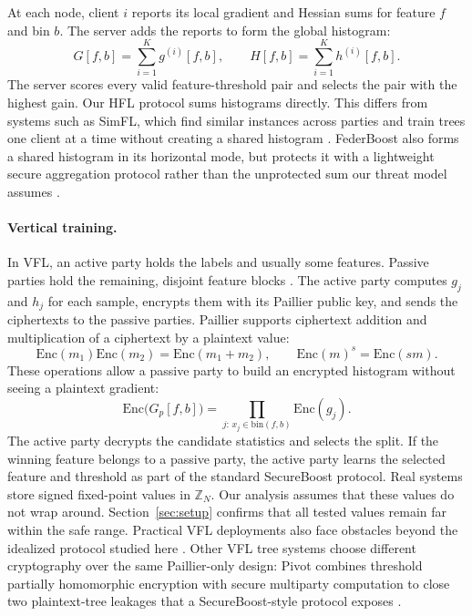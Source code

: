 \documentclass[11pt]{article}
\newcommand{\rev}[1]{#1}
\begin{document}
At each node, client $i$ reports its local gradient and Hessian sums for feature $f$ and bin $b$. The server adds the reports to form the global histogram:
\begin{equation}
G[f,b] = \sum_{i=1}^K g^{(i)}[f,b], \qquad
H[f,b] = \sum_{i=1}^K h^{(i)}[f,b].
\label{eq:hflagg}
\end{equation}
The server scores every valid feature-threshold pair and selects the pair with the highest gain. Our HFL protocol sums histograms directly. This differs from systems such as SimFL, which find similar instances across parties and train trees one client at a time without creating a shared histogram \cite{li2020fedgbdt}. FederBoost also forms a shared histogram in its horizontal mode, but protects it with a lightweight secure aggregation protocol rather than the unprotected sum our threat model assumes \cite{tian2020federboost}.

\paragraph{Vertical training.}
In VFL, an active party holds the labels and usually some features. Passive parties hold the remaining, disjoint feature blocks \cite{cheng2021secureboost}. The active party computes $g_j$ and $h_j$ for each sample, encrypts them with its Paillier public key, and sends the ciphertexts to the passive parties. Paillier supports ciphertext addition and multiplication of a ciphertext by a plaintext value:
\begin{equation}
\mathrm{Enc}(m_1)\mathrm{Enc}(m_2)=\mathrm{Enc}(m_1+m_2), \qquad
\mathrm{Enc}(m)^s=\mathrm{Enc}(sm).
\label{eq:paillier}
\end{equation}
These operations allow a passive party to build an encrypted histogram without seeing a plaintext gradient:
\begin{equation}
\mathrm{Enc}\bigl(G_p[f,b]\bigr)
= \prod_{j:\,x_j\in\mathrm{bin}(f,b)} \mathrm{Enc}(g_j).
\label{eq:vflagg}
\end{equation}
The active party decrypts the candidate statistics and selects the split. If the winning feature belongs to a passive party, the active party learns the selected feature and threshold as part of the standard SecureBoost protocol. Real systems store signed fixed-point values in $\mathbb{Z}_N$. Our analysis assumes that these values do not wrap around. Section~\ref{sec:setup} confirms that all tested values remain far within the safe range. \rev{Practical VFL deployments also face obstacles beyond the idealized protocol studied here \cite{wu2025vflpractice}.} Other VFL tree systems choose different cryptography over the same Paillier-only design: Pivot combines threshold partially homomorphic encryption with secure multiparty computation to close two plaintext-tree leakages that a SecureBoost-style protocol exposes \cite{wu2020pivot}.
\end{document}
